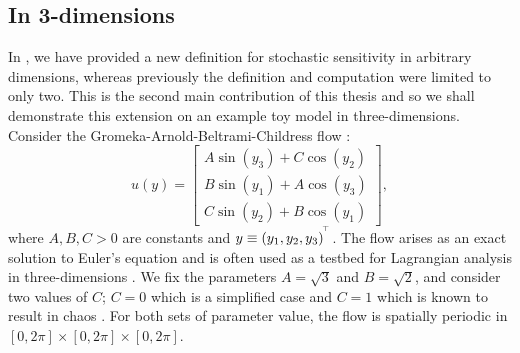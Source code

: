 \subsection{In 3-dimensions}\label{sec:comput_s2_3d}
In , we have provided a new definition for stochastic sensitivity in arbitrary dimensions, whereas previously the definition and computation \citep{Balasuriya_2020_StochasticSensitivityComputable} were limited to only two.
This is the second main contribution of this thesis and so we shall demonstrate this extension on an example toy model in three-dimensions.
Consider the Gromeka-Arnold-Beltrami-Childress flow \citep{DombreEtAl_1986_ChaoticStreamlinesABC}:
\begin{equation}\label{eqn:gabc}
	u\!\left(y\right) = \begin{bmatrix}
		A\sin\!\left(y_3\right) + C\cos\!\left(y_2\right) \\
		B\sin\!\left(y_1\right) + A\cos\!\left(y_3\right) \\
		C\sin\!\left(y_2\right) + B\cos\!\left(y_1\right)
	\end{bmatrix},
\end{equation}
where \(A, B, C > 0\) are constants and \(y \equiv \left(y_1, y_2, y_3\right)^{^{\!\top}}\).
The flow arises as an exact solution to Euler's equation and is often used as a testbed for Lagrangian analysis in three-dimensions \citep[e.g.]{NelsonJacobs_2016_HighorderVisualizationThreedimensional,BruntonRowley_2010_FastComputationFinitetime,Haller_2001_DistinguishedMaterialSurfaces,SulmanEtAl_2013_LeavingFlatlandDiagnostics}.
We fix the parameters \(A = \sqrt{3}\) and \(B = \sqrt{2}\), and consider two values of \(C\); \(C= 0\) which is a simplified case and \(C = 1\) which is known to result in chaos \citep{DombreEtAl_1986_ChaoticStreamlinesABC}.
For both sets of parameter value, the flow is spatially periodic in \([0,2\pi] \times [0,2\pi] \times [0,2\pi]\).

